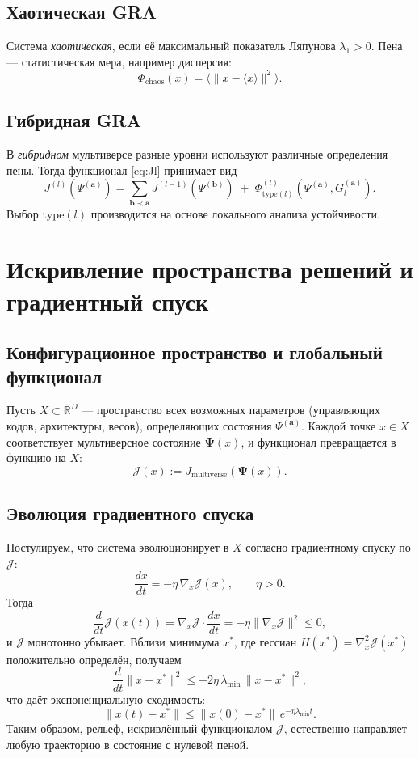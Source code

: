 \documentclass[12pt,a4paper]{article}
\newcommand{\JJ}{\mathcal{J}}
\newcommand{\RR}{\mathbb{R}}
\begin{document}
\subsection{Хаотическая GRA}
Система \emph{хаотическая}, если её максимальный показатель Ляпунова $\lambda_1>0$. Пена — статистическая мера, например дисперсия:
\begin{equation}
\Phi_{\text{chaos}}(x) = \langle \|x - \langle x\rangle\|^2 \rangle.
\end{equation}

\subsection{Гибридная GRA}
В \emph{гибридном} мультиверсе разные уровни используют различные определения пены. Тогда функционал \eqref{eq:Jl} принимает вид
\begin{equation}
J^{(l)}(\Psi^{(\mathbf{a})}) = \sum_{\mathbf{b}\prec\mathbf{a}} J^{(l-1)}(\Psi^{(\mathbf{b})}) \;+\; \Phi^{(l)}_{\text{type}(l)}(\Psi^{(\mathbf{a})}, G_l^{(\mathbf{a})}).
\end{equation}
Выбор $\text{type}(l)$ производится на основе локального анализа устойчивости.

\section{Искривление пространства решений и градиентный спуск}

\subsection{Конфигурационное пространство и глобальный функционал}
Пусть $X\subset\RR^D$ — пространство всех возможных параметров (управляющих кодов, архитектуры, весов), определяющих состояния $\Psi^{(\mathbf{a})}$. Каждой точке $x\in X$ соответствует мультиверсное состояние $\mathbf{\Psi}(x)$, и функционал превращается в функцию на $X$:
\begin{equation}
\JJ(x) := J_{\text{multiverse}}(\mathbf{\Psi}(x)).
\end{equation}

\subsection{Эволюция градиентного спуска}
Постулируем, что система эволюционирует в $X$ согласно градиентному спуску по $\JJ$:
\begin{equation}\label{eq:gradflow}
\frac{dx}{dt} = -\eta\, \nabla_x \JJ(x), \qquad \eta>0.
\end{equation}
Тогда
\[
\frac{d}{dt}\JJ(x(t)) = \nabla_x\JJ \cdot \frac{dx}{dt} = -\eta\|\nabla_x\JJ\|^2 \le 0,
\]
и $\JJ$ монотонно убывает. Вблизи минимума $x^*$, где гессиан $H(x^*)=\nabla_x^2\JJ(x^*)$ положительно определён, получаем
\[
\frac{d}{dt}\|x-x^*\|^2 \le -2\eta\,\lambda_{\min}\,\|x-x^*\|^2,
\]
что даёт экспоненциальную сходимость:
\[
\|x(t)-x^*\| \le \|x(0)-x^*\|\, e^{-\eta\lambda_{\min}t}.
\]
Таким образом, рельеф, искривлённый функционалом $\JJ$, естественно направляет любую траекторию в состояние с нулевой пеной.
\end{document}

